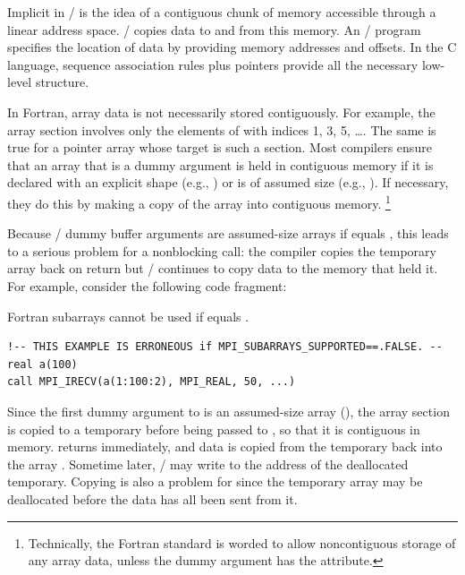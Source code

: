 \begin{itemize}
Implicit in \MPI/ is the idea of a contiguous chunk of memory accessible
through a linear address space.  \MPI/ copies data to and from this
memory. An \MPI/ program specifies the location of data by providing
memory addresses and offsets. In the C language, sequence association
rules plus pointers provide all the necessary low-level structure.

In Fortran, array
data is not necessarily stored contiguously. For
example, the array section  involves only the elements of
 with
indices 1, 3, 5, \ldots. The same is true for a pointer array whose
target is such a section. Most compilers ensure that an array that is a
dummy argument is held in contiguous memory if it is declared with an
explicit shape (e.g., ) or is of assumed size (e.g., ). If
necessary, they do this by making a copy of the array into contiguous
memory.%
\footnote{Technically, the Fortran standard is worded to allow
noncontiguous storage of any array
data, unless the dummy argument has the  attribute.}

Because \MPI/ dummy buffer arguments are assumed-size arrays
if  equals ,
this leads
to a serious problem for a nonblocking call: the compiler copies the
temporary array back on return but \MPI/ continues to copy data to the
memory that held it. For example, consider the following code fragment:
\begin{example}
Fortran subarrays cannot be used if  equals .
\label{exa:lang:subarray:unsupported}
%
%
\begin{lstlisting}[language={[MPI]Fortran}]
!-- THIS EXAMPLE IS ERRONEOUS if MPI_SUBARRAYS_SUPPORTED==.FALSE. --
real a(100)
call MPI_IRECV(a(1:100:2), MPI_REAL, 50, ...)
\end{lstlisting}
\end{example}
Since the first dummy argument to  is an assumed-size
array (), the array section  is copied to
a temporary before being passed to , so that it is
contiguous in memory.  returns immediately, and data is
copied from the temporary back into the array . Sometime later, \MPI/
may write to the address of the deallocated temporary.
Copying is also a problem for  since the temporary
array may be deallocated before the data has all been sent from it.


\end{itemize}
